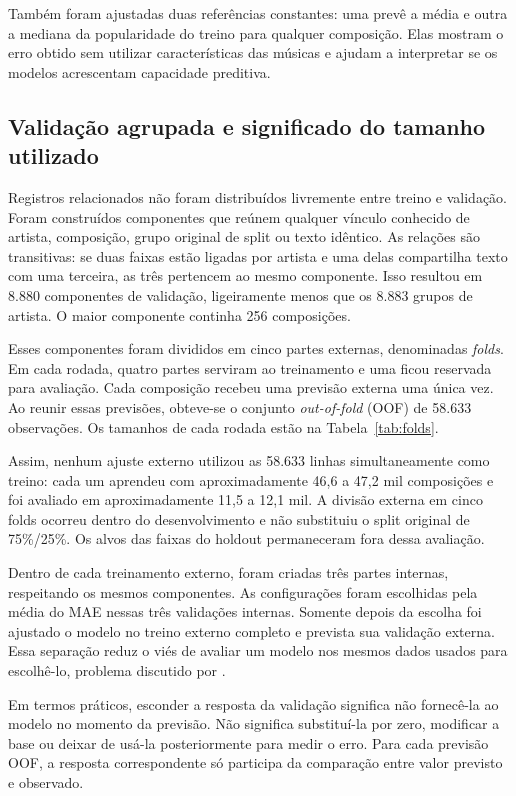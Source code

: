 Também foram ajustadas duas referências constantes: uma prevê a média e outra a mediana da popularidade do treino para qualquer composição. Elas mostram o erro obtido sem utilizar características das músicas e ajudam a interpretar se os modelos acrescentam capacidade preditiva.

\subsection{Validação agrupada e significado do tamanho utilizado}

Registros relacionados não foram distribuídos livremente entre treino e validação. Foram construídos componentes que reúnem qualquer vínculo conhecido de artista, composição, grupo original de split ou texto idêntico. As relações são transitivas: se duas faixas estão ligadas por artista e uma delas compartilha texto com uma terceira, as três pertencem ao mesmo componente. Isso resultou em 8.880 componentes de validação, ligeiramente menos que os 8.883 grupos de artista. O maior componente continha 256 composições.

Esses componentes foram divididos em cinco partes externas, denominadas \textit{folds}. Em cada rodada, quatro partes serviram ao treinamento e uma ficou reservada para avaliação. Cada composição recebeu uma previsão externa uma única vez. Ao reunir essas previsões, obteve-se o conjunto \textit{out-of-fold} (OOF) de 58.633 observações. Os tamanhos de cada rodada estão na Tabela~\ref{tab:folds}.



Assim, nenhum ajuste externo utilizou as 58.633 linhas simultaneamente como treino: cada um aprendeu com aproximadamente 46,6 a 47,2 mil composições e foi avaliado em aproximadamente 11,5 a 12,1 mil. A divisão externa em cinco folds ocorreu dentro do desenvolvimento e não substituiu o split original de 75\%/25\%. Os alvos das faixas do holdout permaneceram fora dessa avaliação.

Dentro de cada treinamento externo, foram criadas três partes internas, respeitando os mesmos componentes. As configurações foram escolhidas pela média do MAE nessas três validações internas. Somente depois da escolha foi ajustado o modelo no treino externo completo e prevista sua validação externa. Essa separação reduz o viés de avaliar um modelo nos mesmos dados usados para escolhê-lo, problema discutido por \citet{cawley2010}.

Em termos práticos, esconder a resposta da validação significa não fornecê-la ao modelo no momento da previsão. Não significa substituí-la por zero, modificar a base ou deixar de usá-la posteriormente para medir o erro. Para cada previsão OOF, a resposta correspondente só participa da comparação entre valor previsto e observado.


